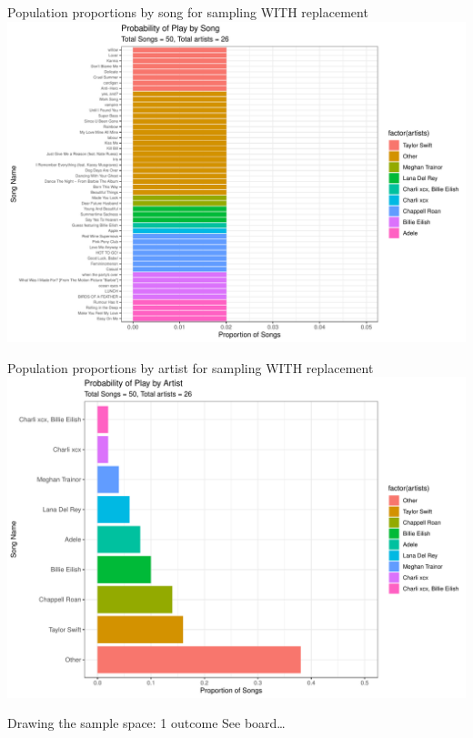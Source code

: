 \documentclass[
  ignorenonframetext,
]{beamer}
\begin{document}
\begin{frame}{Population proportions by song for sampling WITH
replacement}
\label{population-proportions-by-song-for-sampling-with-replacement}
\includegraphics{class10_files/figure-beamer/unnamed-chunk-3-1.pdf}
\end{frame}

\begin{frame}{Population proportions by artist for sampling WITH
replacement}
\label{population-proportions-by-artist-for-sampling-with-replacement}
\includegraphics{class10_files/figure-beamer/unnamed-chunk-4-1.pdf}
\end{frame}

\begin{frame}{Drawing the sample space: 1 outcome}
\label{drawing-the-sample-space-1-outcome}
See board\ldots{}
\end{frame}
\end{document}
